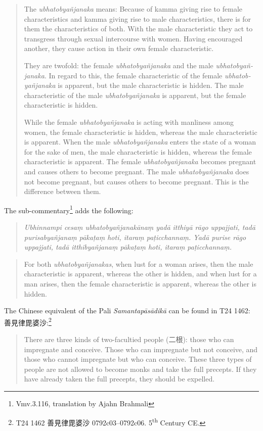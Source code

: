\begin{quote}
The {\em ubhatob­yañ­janaka} means: Because of kamma giving rise to female characteristics and kamma giving rise to male characteristics, there is for them the characteristics of both. With the male characteristic they act to transgress through sexual intercourse with women. Having encouraged another, they cause action in their own female characteristic. 

They are twofold: the female {\em ubhatob­yañ­janaka} and the male {\em ubhatob­yañ­janaka}. In regard to this, the female characteristic of the female {\em ubhatob­yañ­janaka} is apparent, but the male characteristic is hidden. The male characteristic of the male {\em ubhatob­yañ­janaka} is apparent, but the female characteristic is hidden. 

While the female {\em ubhatob­yañ­janaka} is acting with manliness among women, the female characteristic is hidden, whereas the male characteristic is apparent. 
When the male {\em ubhatob­yañ­janaka} enters the state of a woman for the sake of men, the male characteristic is hidden, whereas the female characteristic is apparent. 
The female {\em ubhatob­yañ­janaka} becomes pregnant and causes others to become pregnant. The male {\em ubhatob­yañ­janaka} does not become pregnant, but causes others to become pregnant. This is the difference between them.
\end{quote}

The sub-commentary\footnote{Vmv.3.116, translation by Ajahn Brahmali} adds the following: 
\begin{quote}
{\em Ubhinnampi cesaṃ ubhatobyañjanakānaṃ yadā itthiyā rāgo uppajjati, tadā purisabyañjanaṃ pākaṭaṃ hoti, itaraṃ paṭicchannaṃ. Yadā purise rāgo uppajjati, tadā itthibyañjanaṃ pākaṭaṃ hoti, itaraṃ paṭicchannaṃ.}
\end{quote}

\begin{quote}
For both {\em ubhatob­yañ­janakas}, when lust for a woman arises, then the male characteristic is apparent, whereas the other is hidden, and when lust for a man arises, then the female characteristic is apparent, whereas the other is hidden.
\end{quote}

The Chinese equivalent of the Pali {\em Samantapāsādikā} can be found in T24 1462: 善見律毘婆沙:\footnote{T24 1462 善見律毘婆沙 0792c03–0792c06. 5\textsuperscript{th} Century CE.}
\begin{quote}
There are three kinds of two-facultied people (二根): those who can impregnate and conceive. Those who can impregnate but not conceive, and those who cannot impregnate but who can conceive. These three types of people are not allowed to become monks and take the full precepts. If they have already taken the full precepts, they should be expelled.
\end{quote}

